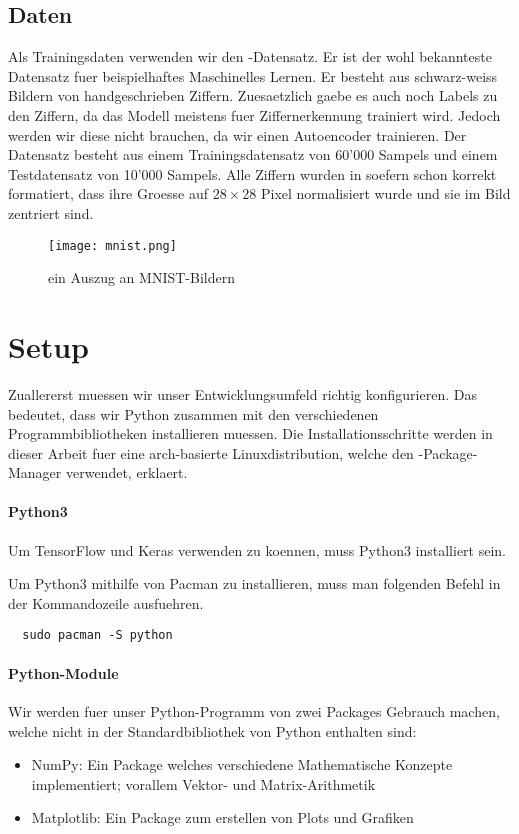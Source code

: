 \para{}
\subsection{Daten}
Als Trainingsdaten verwenden wir den -Datensatz. Er ist der wohl
bekannteste Datensatz fuer beispielhaftes Maschinelles Lernen.
Er besteht aus schwarz-weiss Bildern von handgeschrieben Ziffern.
Zuesaetzlich gaebe es auch noch Labels zu den Ziffern, da das Modell meistens
fuer Ziffernerkennung trainiert wird. Jedoch werden
wir diese nicht brauchen, da wir einen Autoencoder trainieren.
\para{}
Der Datensatz besteht aus einem Trainingsdatensatz von 60'000 Sampels und einem Testdatensatz
von 10'000 Sampels. Alle Ziffern wurden in soefern schon korrekt formatiert,
dass ihre Groesse auf $28 \times 28$ Pixel normalisiert wurde und sie im Bild
zentriert sind.

\begin{figure}
  \centering
  \texttt{[image: mnist.png]}
  \caption{ein Auszug an MNIST-Bildern \cite{res:mnist_images}}
\end{figure}

\para{}
\cite{net:mnist}

\section{Setup}
Zuallererst muessen wir unser Entwicklungsumfeld richtig konfigurieren. Das
bedeutet, dass wir Python zusammen mit den verschiedenen Programmbibliotheken
installieren muessen.
\para{}
Die Installationsschritte werden in dieser Arbeit fuer eine arch-basierte
Linuxdistribution, welche den -Package-Manager verwendet, erklaert.

\paragraph{Python3}
Um TensorFlow und Keras verwenden zu koennen, muss Python3 installiert sein.

Um Python3 mithilfe von Pacman zu installieren, muss man folgenden Befehl in
der Kommandozeile ausfuehren.
\begin{verbatim}
  sudo pacman -S python
\end{verbatim}

\paragraph{Python-Module}
Wir werden fuer unser Python-Programm von zwei Packages Gebrauch machen, welche
nicht in der Standardbibliothek von Python enthalten sind:
\begin{itemize}
\item{NumPy: Ein Package welches verschiedene Mathematische Konzepte
    implementiert; vorallem Vektor- und Matrix-Arithmetik}
\item{Matplotlib: Ein Package zum erstellen von Plots und Grafiken}
\end{itemize}

